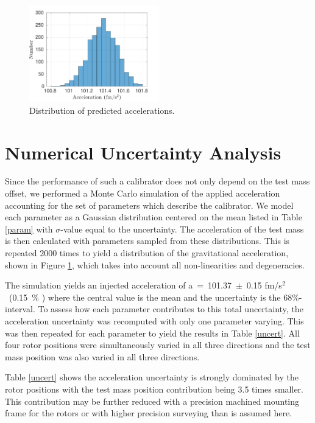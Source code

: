 \documentclass[superscriptaddress, twocolumn, prd]{revtex4-1}
\begin{document}
\begin{figure}[!h]
\centering \includegraphics[width=0.5\textwidth]{Super4_Dist.pdf}
\caption{Distribution of predicted accelerations.}
\label{dist} 
\end{figure}

\section{Numerical Uncertainty Analysis}

Since the performance of such a calibrator does not only depend on the test mass offset, we performed a Monte Carlo simulation of the applied acceleration accounting for the set of parameters which describe the calibrator. We model each parameter as a Gaussian distribution centered on the mean listed in Table \ref{param} with $\sigma$-value equal to the uncertainty. The acceleration of the test mass is then calculated with parameters sampled from these distributions. This is repeated 2000 times to yield a distribution of the gravitational acceleration, shown in Figure \ref{dist}, which takes into account all non-linearities and degeneracies. 


The simulation yields an injected acceleration of a~=~101.37~$\pm$~0.15 fm/s$^2$~(0.15~\% ) where the central value is the mean and the uncertainty is the 68\%-interval. To assess how each parameter contributes to this total uncertainty, the acceleration uncertainty was recomputed with only one parameter varying. This was then repeated for each parameter to yield the results in Table \ref{uncert}. All four rotor positions were simultaneously varied  in all three directions and the test mass position was also varied in all three directions.

Table \ref{uncert} shows the acceleration uncertainty is strongly dominated by the rotor positions with the test mass position contribution being 3.5 times smaller. This contribution may be further reduced with a precision machined mounting frame for the rotors or with higher precision surveying than is assumed here.
\\
\end{document}
